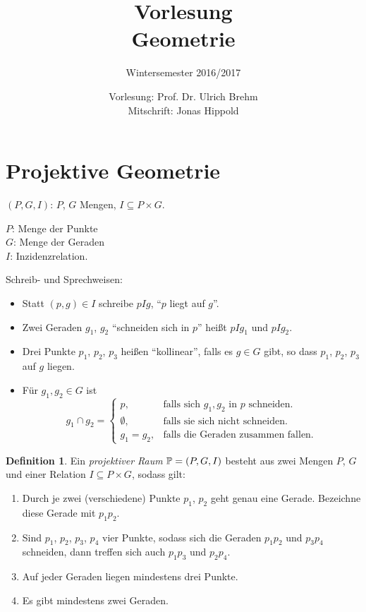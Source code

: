 \documentclass[
 a4paper,
 12pt,
 parskip=half
 ]{scrartcl}
\title{Vorlesung\\Geometrie}
\subtitle{Wintersemester 2016/2017}
\author{Vorlesung: Prof. Dr. Ulrich Brehm\\Mitschrift: Jonas Hippold}
\theoremstyle{plain}
\theoremstyle{definition}
\newtheorem*{defn*}{Definition}
\begin{document}
\maketitle

\tableofcontents

\setcounter{secnumdepth}{0}


\clearpage
\setcounter{secnumdepth}{1}


\clearpage
\section{Projektive Geometrie}
$(P,G,I)$: $P$, $G$ Mengen, $I \subseteq P \times G$.

$P$: Menge der Punkte \\
$G$: Menge der Geraden \\
$I$: Inzidenzrelation.

Schreib- und Sprechweisen:
\begin{itemize}
 \item Statt $(p,g) \in I$ schreibe $pIg$, ``$p$ liegt auf $g$''. 
 \item Zwei Geraden $g_1$, $g_2$ ``schneiden sich in $p$'' heißt $pIg_1$ und $pIg_2$. 
 \item Drei Punkte $p_1$, $p_2$, $p_3$ heißen ``kollinear'', falls es $g \in G$ gibt, so dass $p_1$, $p_2$, $p_3$ auf $g$ liegen.
 \item Für $g_1, g_2 \in G$ ist
  \[ g_1 \cap g_2 = \begin{cases}
                   p, &\text{falls sich } g_1, g_2 \text{ in } p \text{ schneiden.} \\
                   \emptyset, &\text{falls sie sich nicht schneiden.} \\
                   g_1 = g_2, &\text{falls die Geraden zusammen fallen.}
                  \end{cases} \]
\end{itemize}

\begin{defn*}\label{def:proj}
 Ein \emph{projektiver Raum} $\mathbb{P} = (P,G,I)$ besteht aus zwei Mengen $P$, $G$ und einer Relation $I \subseteq P \times G$, sodass gilt:
 \begin{enumerate}[\hspace{.5cm}{A}1)]
  \item Durch je zwei (verschiedene) Punkte $p_1$, $p_2$ geht genau eine Gerade. Bezeichne diese Gerade mit $p_1 p_2$.
  \item Sind $p_1$, $p_2$, $p_3$, $p_4$ vier Punkte, sodass sich die Geraden $p_1 p_2$ und $p_3 p_4$ schneiden, dann treffen sich auch $p_1 p_3$ und $p_2 p_4$.
  \item Auf jeder Geraden liegen mindestens drei Punkte.
  \item Es gibt mindestens zwei Geraden.
 \end{enumerate}
\end{defn*}
\end{document}
